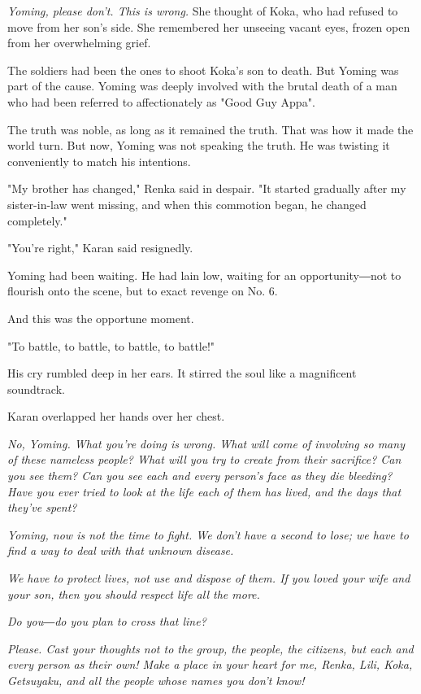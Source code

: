 \emph{Yoming, please don't. This is wrong.} She thought of Koka, who had
refused to move from her son's side. She remembered her unseeing vacant
eyes, frozen open from her overwhelming grief.

The soldiers had been the ones to shoot Koka's son to death. But Yoming
was part of the cause. Yoming was deeply involved with the brutal death
of a man who had been referred to affectionately as "Good Guy Appa".

The truth was noble, as long as it remained the truth. That was how it
made the world turn. But now, Yoming was not speaking the truth. He was
twisting it conveniently to match his intentions.

"My brother has changed," Renka said in despair. "It started gradually
after my sister-in-law went missing, and when this commotion began, he
changed completely."

"You're right," Karan said resignedly.

Yoming had been waiting. He had lain low, waiting for an opportunity―not
to flourish onto the scene, but to exact revenge on No. 6.

And this was the opportune moment.

"To battle, to battle, to battle, to battle!"

His cry rumbled deep in her ears. It stirred the soul like a magnificent
soundtrack.

Karan overlapped her hands over her chest.

\emph{No, Yoming. What you're doing is wrong. What will come of involving so
many of these nameless people? What will you try to create from their
sacrifice? Can you see them? Can you see each and every person's face as
they die bleeding? Have you ever tried to look at the life each of them
has lived, and the days that they've spent?}

\emph{Yoming, now is not the time to fight. We don't have a second to lose; we
have to find a way to deal with that unknown disease.}

\emph{We have to protect lives, not use and dispose of them. If you loved your
wife and your son, then you should respect life all the more.}

\emph{Do you―do you plan to cross that line?}

\emph{Please. Cast your thoughts not to the group, the people, the citizens,
but each and every person as their own! Make a place in your heart for
me, Renka, Lili, Koka, Getsuyaku, and all the people whose names you
don't know!}

